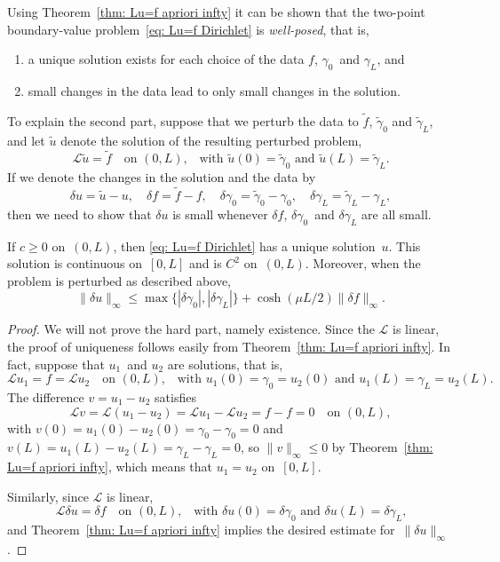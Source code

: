 Using Theorem~\ref{thm: Lu=f apriori infty} it can be shown that
the two-point boundary-value problem~\eqref{eq: Lu=f Dirichlet} is 
\emph{well-posed}, that is, 
\begin{enumerate}
\item a unique solution exists for each choice of the data $f$, $\gamma_0$~and 
$\gamma_L$, and 
\item small changes in the data lead to only small changes in the solution.
\end{enumerate}
To explain the second part, suppose that we perturb the data to $\tilde f$, 
$\tilde\gamma_0$ and $\tilde\gamma_L$, and let $\tilde u$ denote the solution 
of the resulting perturbed problem,
\[
\mathcal{L}\tilde u=\tilde f\quad\text{on $(0,L)$,}
    \quad\text{with $\tilde u(0)=\tilde\gamma_0$ 
and $\tilde u(L)=\tilde\gamma_L$.}
\]
If we denote the changes in the solution and the data by
\[
\delta u=\tilde u-u,\quad\delta f=\tilde f-f,\quad
\delta\gamma_0=\tilde\gamma_0-\gamma_0,\quad
\delta\gamma_L=\tilde\gamma_L-\gamma_L,
\]
then we need to show that $\delta u$ is small whenever $\delta f$, 
$\delta\gamma_0$~and $\delta\gamma_L$ are all small.

\begin{theorem}
If $c\ge0$ on~$(0,L)$, then \eqref{eq: Lu=f Dirichlet} has a unique 
solution~$u$.  This solution is continuous on~$[0,L]$ and is $C^2$ on~$(0,L)$.
Moreover, when the problem is perturbed as described above, 
\[
\|\delta u\|_\infty\le\max\{|\delta\gamma_0|,|\delta\gamma_L|\}
    +\cosh(\mu L/2)\|\delta f\|_\infty.
\]
\end{theorem}
\begin{proof}
We will not prove the hard part, namely existence.  Since the $\mathcal{L}$ is 
linear, the proof of uniqueness follows easily from 
Theorem~\ref{thm: Lu=f apriori infty}.  In fact, suppose that $u_1$~and $u_2$ 
are solutions, that is,
\[
\mathcal{L}u_1=f=\mathcal{L}u_2\quad\text{on $(0,L)$,}
    \quad\text{with $u_1(0)=\gamma_0=u_2(0)$ and $u_1(L)=\gamma_L=u_2(L)$.}
\]
The difference $v=u_1-u_2$ satisfies
\[
\mathcal{L}v=\mathcal{L}(u_1-u_2)=\mathcal{L}u_1-\mathcal{L}u_2=f-f=0
    \quad\text{on $(0,L)$},
\]
with $v(0)=u_1(0)-u_2(0)=\gamma_0-\gamma_0=0$ and
$v(L)=u_1(L)-u_2(L)=\gamma_L-\gamma_L=0$, so $\|v\|_\infty\le0$ by 
Theorem~\ref{thm: Lu=f apriori infty}, which means that $u_1=u_2$ on~$[0,L]$.

Similarly, since $\mathcal{L}$ is linear,
\[
\mathcal{L}\delta u=\delta f\quad\text{on $(0,L)$,}
    \quad\text{with $\delta u(0)=\delta\gamma_0$ 
and $\delta u(L)=\delta\gamma_L$,}
\]
and Theorem~\ref{thm: Lu=f apriori infty} implies the desired estimate 
for~$\|\delta u\|_\infty$.
\end{proof}


